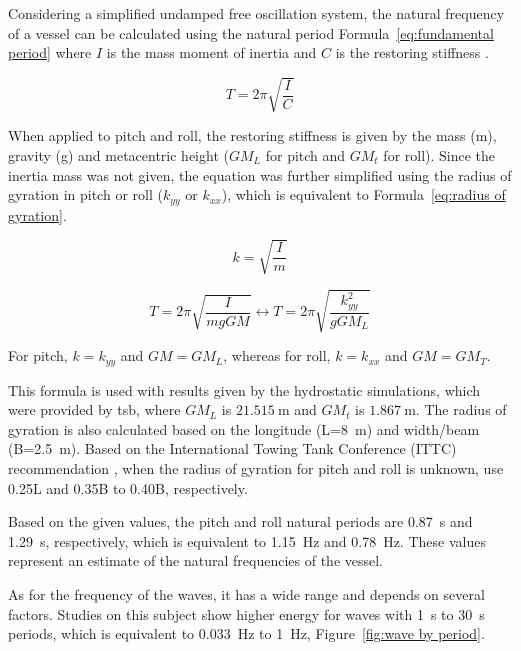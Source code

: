 Considering a simplified undamped free oscillation system, the natural frequency of a vessel can be calculated using the natural period Formula~\ref{eq:fundamental period} where $I$ is the mass moment of inertia and $C$ is the restoring stiffness \cite{rao2011mechanical}.

\begin{equation}
    T = 2\pi \sqrt{\frac{I}{C}}
    \label{eq:fundamental period}
\end{equation}

When applied to pitch and roll, the restoring stiffness is given by the mass (m), gravity (g) and metacentric height ($GM_L$ for pitch and $GM_t$ for roll). Since the inertia mass was not given, the equation was further simplified using the radius of gyration in pitch or roll ($k_{yy}$ or $k_{xx}$), which is equivalent to Formula~\ref{eq:radius of gyration}.

\begin{equation}
    k = \sqrt{\frac{I}{m}}
    \label{eq:radius of gyration}
\end{equation}

\begin{equation}
    T = 2\pi \sqrt{\frac{I}{mgGM}} \leftrightarrow T = 2\pi \sqrt{\frac{k_{yy}^2}{gGM_L}}
    \label{eq: natural period}
\end{equation}

For pitch, $k=k_{yy}$ and $GM=GM_L$, whereas for roll, $k=k_{xx}$ and $GM=GM_T$.

This formula is used with results given by the hydrostatic simulations, which were provided by \ac{tsb}, where $GM_L$ is $21.515~\mathrm{m}$ and $GM_t$ is $1.867~\mathrm{m}$. The radius of gyration is also calculated based on the longitude (L=8~m) and width/beam (B=2.5~m). Based on the International Towing Tank Conference (ITTC) recommendation \cite{ittc_seakeeping_2024}, when the radius of gyration for pitch and roll is unknown, use 0.25L and 0.35B to 0.40B, respectively.

Based on the given values, the pitch and roll natural periods are 0.87~s and 1.29~s, respectively, which is equivalent to 1.15~Hz and 0.78~Hz. These values represent an estimate of the natural frequencies of the vessel.

As for the frequency of the waves, it has a wide range and depends on several factors. Studies on this subject show higher energy for waves with 1~s to 30~s periods, which is equivalent to 0.033~Hz to 1~Hz, Figure~\ref{fig:wave by period}.

